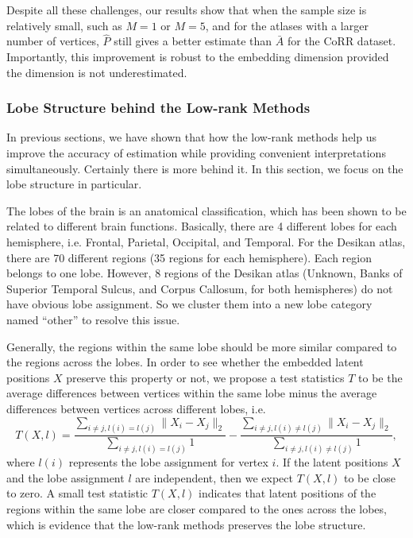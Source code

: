 \documentclass[10pt,letterpaper]{article}
\renewcommand{\hat}{\widehat}
\begin{document}
Despite all these challenges, our results show that when the sample size is relatively small, such as $M=1$ or $M=5$, and for the atlases with a larger number of vertices, $\hat{P}$ still gives a better estimate than $\bar{A}$ for the CoRR dataset.
Importantly, this improvement is robust to the embedding dimension provided the dimension is not underestimated.



\subsubsection{Lobe Structure behind the Low-rank Methods}
\label{section:lobe_structure}
In previous sections, we have shown that how the low-rank methods help us improve the accuracy of estimation while providing convenient interpretations simultaneously. Certainly there is more behind it. In this section, we focus on the lobe structure in particular.

The lobes of the brain is an anatomical classification, which has been shown to be related to different brain functions. Basically, there are 4 different lobes for each hemisphere, i.e. Frontal, Parietal, Occipital, and Temporal.
For the Desikan atlas, there are 70 different regions (35 regions for each hemisphere). Each region belongs to one lobe. However, 8 regions of the Desikan atlas (Unknown, Banks of Superior Temporal Sulcus, and Corpus Callosum, for both hemispheres) do not have obvious lobe assignment. So we cluster them into a new lobe category named ``other'' to resolve this issue.

Generally, the regions within the same lobe should be more similar compared to the regions across the lobes. In order to see whether the embedded latent positions $X$ preserve this property or not, we propose a test statistics $T$ to be the average differences between vertices within the same lobe minus the average differences between vertices across different lobes, i.e.
\[
T(X, l) = \frac{\sum_{i \ne j, l(i) = l(j)} \|X_i - X_j \|_2}{\sum_{i \ne j, l(i) = l(j)} 1} -
\frac{\sum_{i \ne j, l(i) \ne l(j)} \|X_i - X_j \|_2}{\sum_{i \ne j, l(i) \ne l(j)} 1},
\]
where $l(i)$ represents the lobe assignment for vertex $i$. If the latent positions $X$ and the lobe assignment $l$ are independent, then we expect $T(X, l)$ to be close to zero. A small test statistic $T(X, l)$ indicates that latent positions of the regions within the same lobe are closer compared to the ones across the lobes, which is evidence that the low-rank methods preserves the lobe structure.
\end{document}
